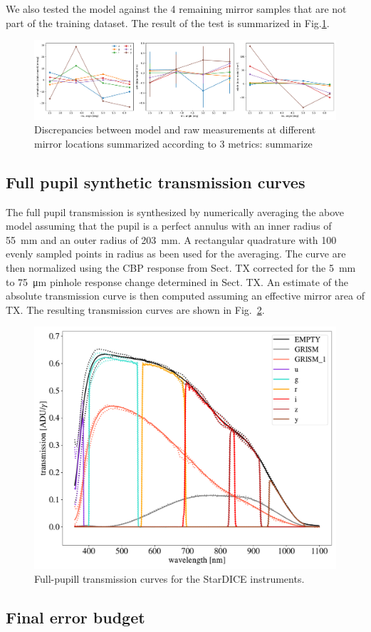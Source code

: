 We also tested the model against the 4 remaining mirror samples that
are not part of the training dataset. The result of the test is
summarized in Fig.\ref{fig:metrics}.

\begin{figure}
  \centering
  \includegraphics[width=1\linewidth]{fig/metrics.pdf}
  \caption{Discrepancies between model and raw measurements at different mirror locations summarized according to 3 metrics: summarize}
  \label{fig:metrics}
\end{figure}

\subsection{Full pupil synthetic transmission curves}

The full pupil transmission is synthesized by numerically averaging
the above model assuming that the pupil is a perfect annulus with an
inner radius of \SI{55}{mm} and an outer radius of \SI{203}{mm}. A
rectangular quadrature with 100 evenly sampled points in radius as
been used for the averaging. The curve are then normalized using the
CBP response from Sect. TX corrected for the \SI{5}{mm} to \SI{75}{\micro\meter} pinhole
response change determined in Sect. TX. An estimate of the absolute
transmission curve is then computed assuming an effective mirror area
of TX. The resulting transmission curves are shown in
Fig.~\ref{fig:fullpupiltrans}.
\begin{figure}
  \centering
  \includegraphics[width=1\linewidth]{fig/fullpupill.pdf}
  \caption{Full-pupill transmission curves for the StarDICE instruments.}
  \label{fig:fullpupiltrans}
\end{figure}


\subsection{Final error budget}
